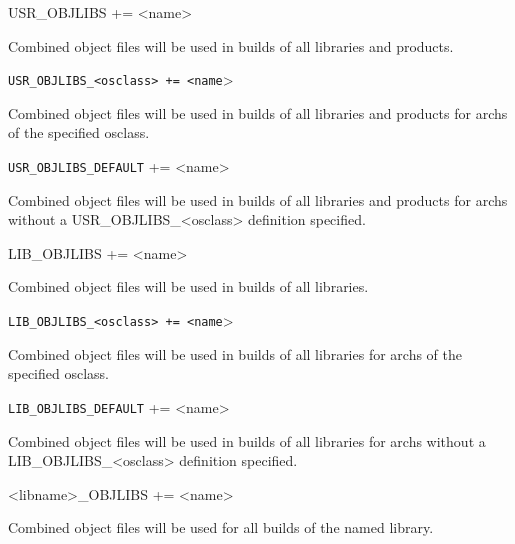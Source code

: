 \begin{description}\item {}USR\_OBJLIBS += \textless{}name\textgreater{}

\end{description}Combined object files will be used in builds of all libraries and products.

\begin{description}\item \verb|USR_OBJLIBS_<osclass> += <name|\textgreater{}

\end{description}Combined object files will be used in builds of all libraries and products for archs of the specified osclass.

\begin{description}\item \verb|USR_OBJLIBS_DEFAULT| += \textless{}name\textgreater{}

\end{description}Combined object files will be used in builds of all libraries and products for archs without a 
USR\_OBJLIBS\_\textless{}osclass\textgreater{} definition specified.



\begin{description}\item {}LIB\_OBJLIBS += \textless{}name\textgreater{}

\end{description}Combined object files will be used in builds of all libraries.

\begin{description}\item \verb|LIB_OBJLIBS_<osclass> += <name|\textgreater{}

\end{description}Combined object files will be used in builds of all libraries for archs of the specified osclass.

\begin{description}\item \verb|LIB_OBJLIBS_DEFAULT| += \textless{}name\textgreater{}

\end{description}Combined object files will be used in builds of all libraries for archs without a LIB\_OBJLIBS\_\textless{}osclass\textgreater{} 
definition specified.



\begin{description}\item \textless{}libname\textgreater{}\_OBJLIBS += \textless{}name\textgreater{}

\end{description}Combined object files will be used for all builds of the named library.

